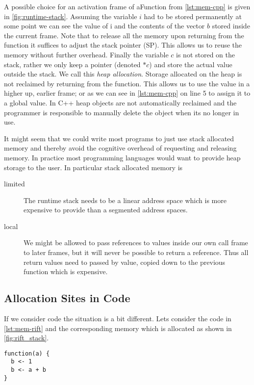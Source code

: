 A possible choice for an activation frame of aFunction from \autoref{lst:mem-cpp} is given in \autoref{fig:runtime-stack}. Assuming the variable $i$ had to be stored permanently at some point we can see the value of i and the contents of the vector $b$ stored inside the current frame. Note that to release all the memory upon returning from the function it suffices to adjust the stack pointer (SP). This allows us to reuse the memory without further overhead. Finally the variable $c$ is not stored on the stack, rather we only keep a pointer (denoted $*c$) and store the actual value outside the stack. We call this \emph{heap allocation}. Storage allocated on the heap is not reclaimed by returning from the function. This allows us to use the value in a higher up, \ie earlier frame; or as we can see in \autoref{lst:mem-cpp} on line 5 to assign it to a global value. In C++ heap objects are not automatically reclaimed and the programmer is responsible to manually delete the object when its no longer in use.

It might seem that we could write most programs to just use stack allocated memory and thereby avoid the cognitive overhead of requesting and releasing memory. In practice most programming languages would want to provide heap storage to the user. In particular stack allocated memory is

\begin{description}
  \item[limited] The runtime stack needs to be a linear address space which is more expensive to provide than a segmented address spaces.
  \item[local] We might be allowed to pass references to values inside our own call frame to later frames, but it will never be possible to return a reference. Thus all return values need to passed by value, \ie copied down to the previous function which is expensive.
\end{description}

\subsection{Allocation Sites in \rift Code}

If we consider \rift code the situation is a bit different. Lets consider the code in \autoref{lst:mem-rift} and the corresponding memory which is allocated as shown in \autoref{fig:rift_stack}.

\begin{lstlisting}[language=rift, caption={Some values allocated in \rift.}, label={lst:mem-rift}]
function(a) {
  b <- 1
  b <- a + b
}
\end{lstlisting}

